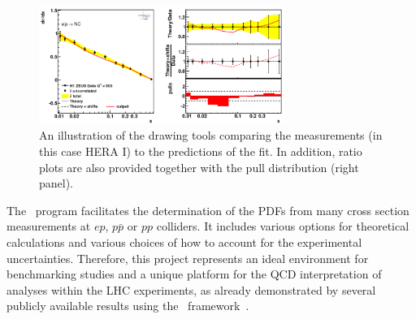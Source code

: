 \begin{description}
\begin{figure}[!ht]
   \centering
   \includegraphics[width=8cm]{datatheory.pdf}
   \caption{An illustration of the \fitter drawing tools comparing the measurements (in this case HERA I) to the predictions of the fit. In addition, ratio plots are also provided together with the pull distribution (right panel).} 
 \label{fig:data}
\end{figure}

\end{description}
%


The \fitter\ program facilitates the determination of the PDFs from many 
cross section measurements at $ep$, $p\bar{p}$ or $pp$ colliders.  
 It includes various options for theoretical calculations and various choices 
of how to 
account for the experimental uncertainties. Therefore, this project represents 
an ideal environment for benchmarking studies and a unique platform for the QCD interpretation of analyses within the LHC experiments,
as already demonstrated by several publicly available results using the \fitter\ 
framework~\cite{atlas:strange,atlas:jets,atlas:hm,cms:strange,cms:jets,h1:2012kk,h1zeus:charm}.  

